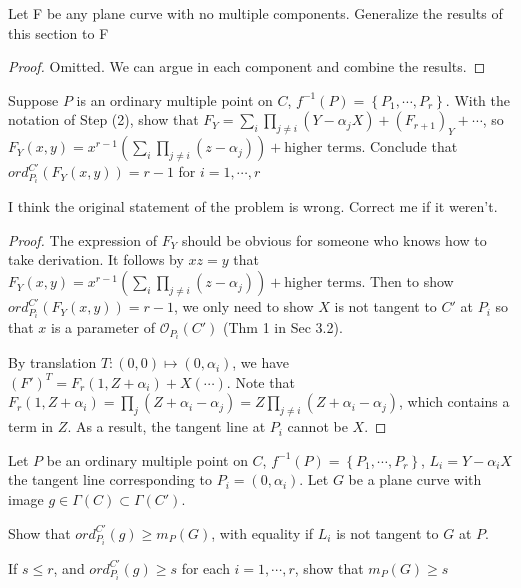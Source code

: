\documentclass{solution}
\begin{document}
\begin{problem}{7.3}
    Let F be any plane curve with no multiple components. Generalize the results of this section to F
\end{problem}

\begin{proof}
    Omitted. We can argue in each component and combine the results.
\end{proof}

\begin{problem}{7.4}
    Suppose $P$ is an ordinary multiple point on $C$, $f ^{-1}(P) = \left\lbrace P_1, \cdots, P_r \right\rbrace$. With the notation of Step (2), show that $F_Y = \sum\limits_{i} \prod\limits_{j \ne i} (Y - \alpha_j X) + (F_{r + 1})_Y + \cdots$, so $F_Y(x, y) = x^{r - 1} (\sum\limits_{i}\prod\limits_{j \ne i} (z - \alpha_j)) + \text{higher terms}$. Conclude that $ord_{P_i}^{C'}(F_Y(x, y)) = r - 1$ for $i = 1, \cdots, r$
\end{problem}

I think the original statement of the problem is wrong. Correct me if it weren't.

\begin{proof}
    The expression of $F_Y$ should be obvious for someone who knows how to take derivation. It follows by $xz = y$ that $F_Y(x, y) = x^{r - 1} (\sum\limits_{i}\prod\limits_{j \ne i} (z - \alpha_j)) + \text{higher terms}$. Then to show $ord_{P_i}^{C'} (F_Y(x, y)) = r - 1$, we only need to show $X$ is not tangent to $C'$ at $P_i$ so that $x$ is a parameter of $\mathcal{O}_{P_i}(C')$ (Thm 1 in Sec 3.2).
    
    By translation $T: (0, 0) \mapsto (0, \alpha_i)$, we have $(F')^T = F_r(1, Z + \alpha_i) + X(\cdots)$. Note that $F_r(1, Z + \alpha_i) = \prod\limits_{j} (Z + \alpha_i - \alpha_j) = Z \prod\limits_{j \ne i} (Z + \alpha_i - \alpha_j)$, which contains a term in $Z$. As a result, the tangent line at $P_i$ cannot be $X$.
\end{proof}

\begin{problem}{7.5}
    Let $P$ be an ordinary multiple point on $C$, $f ^{-1}(P) = \left\lbrace P_1, \cdots, P_r \right\rbrace$, $L_i = Y - \alpha_i X$ the tangent line corresponding to $P_i = (0, \alpha_i)$. Let $G$ be a plane curve with image $g \in \Gamma(C) \subset \Gamma(C')$. \begin{inparaenum}
        \item Show that $ord_{P_i}^{C'}(g) \ge m_P(G)$, with equality if $L_i$ is not tangent to $G$ at $P$.
        \item If $s \le r$, and $ord_{P_i}^{C'}(g) \ge s$ for each $i = 1, \cdots, r$, show that $m_P(G) \ge s$
    \end{inparaenum}
\end{problem}
\end{document}
